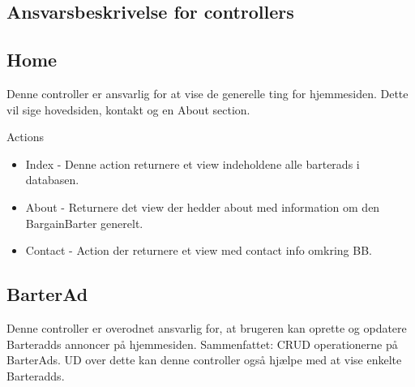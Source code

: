 \subsection{Ansvarsbeskrivelse for controllers}

\subsection{Home}
Denne controller er ansvarlig for at vise de generelle ting for hjemmesiden. Dette vil sige hovedsiden, kontakt og en About section.  

Actions
\begin{itemize}
	\item Index
	- Denne action returnere et view indeholdene alle barterads i databasen. 
	\item About
	- Returnere det view der hedder about med information om den BargainBarter generelt.
	\item Contact
	- Action der returnere et view med contact info omkring BB.
\end{itemize}


\subsection{BarterAd}
Denne controller er overodnet ansvarlig for, at brugeren kan oprette og opdatere Barteradds annoncer på hjemmesiden. Sammenfattet: CRUD operationerne på BarterAds. UD over dette kan denne controller også hjælpe med at vise enkelte Barteradds.

